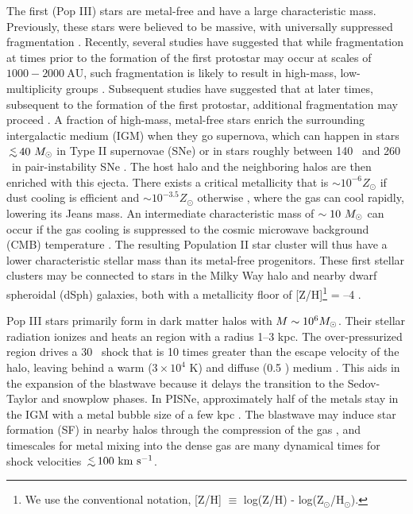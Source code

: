 \documentclass[12pt,preprint]{aastex}
\begin{document}
The first (Pop III) stars are metal-free and have a large
characteristic mass.  Previously, these stars were believed to be
massive, with universally suppressed fragmentation \citep{ABN02,
Bromm02_P3, OShea07a}.  Recently, several studies have suggested that
while fragmentation at times prior to the formation of the first
protostar may occur at scales of $1000-2000~\mathrm{AU}$, such
fragmentation is likely to result in high-mass, low-multiplicity
groups \citep{2009Sci...325..601T, Stacy10_Binary}.  Subsequent
studies have suggested that at later times, subsequent to the
formation of the first protostar, additional fragmentation may proceed
\citep{Greif11_P3Cluster, Clark11_Frag}.  A fraction of high-mass,
metal-free stars enrich the surrounding intergalactic medium (IGM)
when they go supernova, which can happen in stars $\lsim 40~\Ms$ in
Type II supernovae (SNe) or in stars roughly between 140 \Ms~and 260
\Ms~in pair-instability SNe \citep[PISNe;][]{2002ApJ...567..532H}.
The host halo and the neighboring halos are then enriched with this
ejecta.  There exists a critical metallicity that is $\sim 10^{-6}
Z_\odot$ if dust cooling is efficient \citep{Omukai05,
Schneider06_Frag, clark08} and $\sim 10^{-3.5} Z_\odot$ otherwise
\citep{Bromm01, 2009ApJ...691..441S}, where the gas can cool rapidly,
lowering its Jeans mass.  An intermediate characteristic mass of
$\sim10~\Ms$ can occur if the gas cooling is suppressed to the cosmic
microwave background (CMB) temperature \citep{Larson98,
Tumlinson07_IMF, 2009ApJ...691..441S}.  The resulting Population II
star cluster will thus have a lower characteristic stellar mass than
its metal-free progenitors.  These first stellar clusters may be
connected to stars in the Milky Way halo and nearby dwarf spheroidal
(dSph) galaxies, both with a metallicity floor of [Z/H]\footnote{We
use the conventional notation, [Z/H] $\equiv$ log(Z/H) -
log(Z$_\odot$/H$_\odot$).} = --4 \citep{Beers05, Frebel10_Obs,
Tafelmeyer10}.

Pop III stars primarily form in dark matter halos with $M \sim 10^6
\Ms$.  Their stellar radiation ionizes and heats an  region
with a radius 1--3 kpc.  The over-pressurized  region drives
a 30 \kms~shock that is 10 times greater than the escape velocity of
the halo, leaving behind a warm ($3 \times 10^4$ K) and diffuse (0.5
\cubecm) medium \citep{Kitayama04, Whalen04, Abel07}.  This aids in
the expansion of the blastwave because it delays the transition to the
Sedov-Taylor and snowplow phases.  In PISNe, approximately half of the
metals stay in the IGM with a metal bubble size of a few kpc
\citep{Wise08_Gal, Greif10}.  The blastwave may induce star formation
(SF) in nearby halos through the compression of the gas
\citep{Ferrara98}, and timescales for metal mixing into the dense gas
are many dynamical times \citep{Cen08} for shock velocities
$\lsim100~\kms$.
\end{document}
